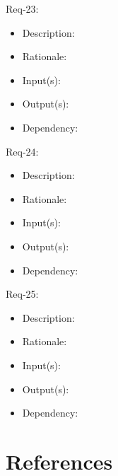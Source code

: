 \documentclass[12pt]{article}
\begin{document}
Req-23:  
\begin{itemize}
    \item Description: 
    \item Rationale: 
    \item Input(s): 
    \item Output(s): 
    \item Dependency: 
\end{itemize}
Req-24: 
\begin{itemize}
    \item Description: 
    \item Rationale: 
    \item Input(s): 
    \item Output(s): 
    \item Dependency: 
\end{itemize}
Req-25: 
\begin{itemize}
    \item Description: 
    \item Rationale: 
    \item Input(s): 
    \item Output(s): 
    \item Dependency: 
\end{itemize}
\section{References}

\begingroup
\renewcommand{\section}[2]{}
\begin{thebibliography}{10}

    \bigskip


\end{thebibliography}
\endgroup
\end{document}
